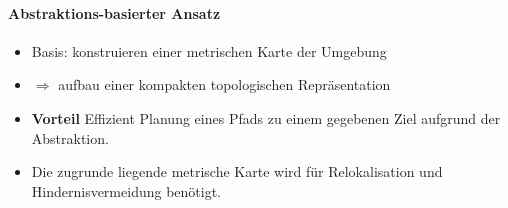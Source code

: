 \paragraph{Abstraktions-basierter Ansatz}
\begin{itemize}
	\item Basis: konstruieren einer metrischen Karte der Umgebung
	\item $\Rightarrow$ aufbau einer kompakten topologischen Repräsentation
	\item \textbf{Vorteil} Effizient Planung eines Pfads zu einem gegebenen Ziel aufgrund der Abstraktion.
	\item Die zugrunde liegende metrische Karte wird für Relokalisation und Hindernisvermeidung benötigt.
\end{itemize}





































